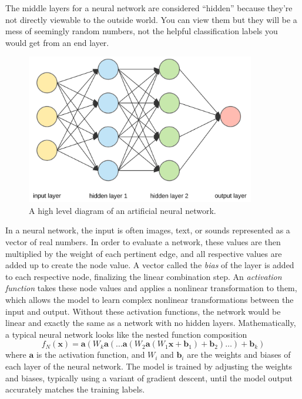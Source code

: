 The middle layers for a neural network are considered ``hidden'' because they're not directly viewable to the outside world. 
You can view them but they will be a mess of seemingly random numbers, not the helpful classification labels you would get from an end layer.


\begin{figure}[h]
\includegraphics[width=10cm]{figures/neural_net.png}
\caption{A high level diagram of an artificial neural network.}
\label{fig:neuralnet}
\end{figure}

In a neural network, the input is often images, text, or sounds represented as a vector of real numbers.
In order to evaluate a network, these values are then multiplied by the weight of each pertinent edge, and all respective values are added up to create the node value.
A vector called the \emph{bias} of the layer is added to each respective node, finalizing the linear combination step.
An \emph{activation function} takes these node values and applies a nonlinear transformation to them, which allows the model to learn complex nonlinear transformations between the input and output.
Without these activation functions, the network would be linear and exactly the same as a network with no hidden layers.
Mathematically, a typical neural network looks like the nested function composition
\[
f_N(\mathbf{x}) = \mathbf{a}(W_k\mathbf{a}(\ldots\mathbf{a}(W_2\mathbf{a}(W_1\mathbf{x}+\mathbf{b}_1)+\mathbf{b}_2)\ldots)+\mathbf{b}_k)
\]
where \(\mathbf{a}\) is the activation function, and \(W_i\) and \(\mathbf{b}_i\) are the weights and biases of each layer of the neural network.
The model is trained by adjusting the weights and biases, typically using a variant of gradient descent, until the model output accurately matches the training labels.


